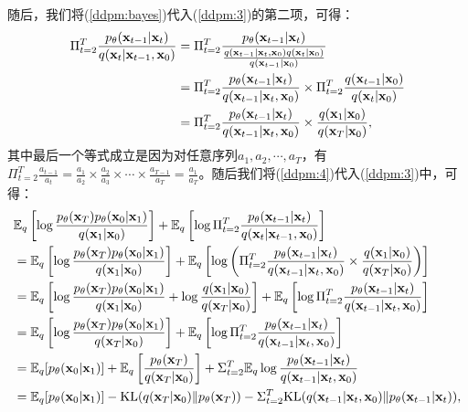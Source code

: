 \documentclass[11pt,a4paper,UTF8]{ctexart}
\begin{document}
随后，我们将(\ref{ddpm:bayes})代入(\ref{ddpm:3})的第二项，可得：
\begin{align}
\begin{split}
    \Pi_{t=2}^T \frac{p_{\theta}(\mathbf{x}_{t-1}|\mathbf{x}_t)}{q(\mathbf{x}_t|\mathbf{x}_{t-1},\mathbf{x}_0)} &= \Pi_{t=2}^T \frac{p_{\theta}(\mathbf{x}_{t-1}|\mathbf{x}_t)}{\frac{q(\mathbf{x}_{t-1}|\mathbf{x}_t,\mathbf{x}_0)q(\mathbf{x}_t|\mathbf{x}_0)}{q(\mathbf{x}_{t-1}|\mathbf{x}_0)}} \\
    &= \Pi_{t=2}^T \frac{p_{\theta}(\mathbf{x}_{t-1}|\mathbf{x}_t)}{q(\mathbf{x}_{t-1}|\mathbf{x}_t,\mathbf{x}_0)}  \times \Pi_{t=2}^T \frac{q(\mathbf{x}_{t-1}|\mathbf{x}_0)}{q(\mathbf{x}_t|\mathbf{x}_0)} \\
    &= \Pi_{t=2}^T \frac{p_{\theta}(\mathbf{x}_{t-1}|\mathbf{x}_t)}{q(\mathbf{x}_{t-1}|\mathbf{x}_t,\mathbf{x}_0)}  \times \frac{q(\mathbf{x}_1|\mathbf{x}_0)}{q(\mathbf{x}_T|\mathbf{x}_0)},
\end{split}
\label{ddpm:4}
\end{align}
其中最后一个等式成立是因为对任意序列$a_1,a_2,\cdots,a_T$，有$\Pi_{t=2}^T\frac{a_{t-1}}{a_t}=\frac{a_1}{a_2}\times\frac{a_2}{a_3}\times\cdots\times\frac{a_{T-1}}{a_T}=\frac{a_1}{a_T}$。随后我们将(\ref{ddpm:4})代入(\ref{ddpm:3})中，可得：
\begin{align}
\begin{split}
    & \mathbb{E}_q \left[\log\frac{p_{\theta}(\mathbf{x}_T)p_{\theta}(\mathbf{x}_0|\mathbf{x}_1)}{q(\mathbf{x}_1|\mathbf{x}_0)} \right] + \mathbb{E}_q \left[\log \Pi_{t=2}^T \frac{p_{\theta}(\mathbf{x}_{t-1}|\mathbf{x}_t)}{q(\mathbf{x}_t|\mathbf{x}_{t-1},\mathbf{x}_0)} \right] \\
    &= \mathbb{E}_q \left[\log\frac{p_{\theta}(\mathbf{x}_T)p_{\theta}(\mathbf{x}_0|\mathbf{x}_1)}{q(\mathbf{x}_1|\mathbf{x}_0)} \right] + \mathbb{E}_q \left[\log \left(\Pi_{t=2}^T \frac{p_{\theta}(\mathbf{x}_{t-1}|\mathbf{x}_t)}{q(\mathbf{x}_{t-1}|\mathbf{x}_t,\mathbf{x}_0)}  \times \frac{q(\mathbf{x}_1|\mathbf{x}_0)}{q(\mathbf{x}_T|\mathbf{x}_0)}\right) \right] \\
    &=\mathbb{E}_q \left[\log\frac{p_{\theta}(\mathbf{x}_T)p_{\theta}(\mathbf{x}_0|\mathbf{x}_1)}{q(\mathbf{x}_1|\mathbf{x}_0)} + \log \frac{q(\mathbf{x}_1|\mathbf{x}_0)}{q(\mathbf{x}_T|\mathbf{x}_0)} \right] + \mathbb{E}_q \left[\log \Pi_{t=2}^T \frac{p_{\theta}(\mathbf{x}_{t-1}|\mathbf{x}_t)}{q(\mathbf{x}_{t-1}|\mathbf{x}_t,\mathbf{x}_0)}  \right] \\
    &= \mathbb{E}_q \left[\log\frac{p_{\theta}(\mathbf{x}_T)p_{\theta}(\mathbf{x}_0|\mathbf{x}_1)}{q(\mathbf{x}_T|\mathbf{x}_0)} \right] + \mathbb{E}_q \left[\log \Pi_{t=2}^T \frac{p_{\theta}(\mathbf{x}_{t-1}|\mathbf{x}_t)}{q(\mathbf{x}_{t-1}|\mathbf{x}_t,\mathbf{x}_0)}  \right] \\
    &= \mathbb{E}_q [p_{\theta}(\mathbf{x}_0|\mathbf{x}_1)] + \mathbb{E}_q\left[\frac{p_{\theta}(\mathbf{x}_T)}{q(\mathbf{x}_T|\mathbf{x}_0)}\right] + \Sigma_{t=2}^T \mathbb{E}_q \log \frac{p_{\theta}(\mathbf{x}_{t-1}|\mathbf{x}_t)}{q(\mathbf{x}_{t-1}|\mathbf{x}_t,\mathbf{x}_0)} \\
    &= \mathbb{E}_q [p_{\theta}(\mathbf{x}_0|\mathbf{x}_1)] -\text{KL}(q(\mathbf{x}_T|\mathbf{x}_0)\| p_{\theta}(\mathbf{x}_T)) -  \Sigma_{t=2}^T \text{KL}(q(\mathbf{x}_{t-1}|\mathbf{x}_t,\mathbf{x}_0) \| p_{\theta}(\mathbf{x}_{t-1}|\mathbf{x}_t)),
\end{split}
\label{ddpm:5}
\end{align}
\end{document}
